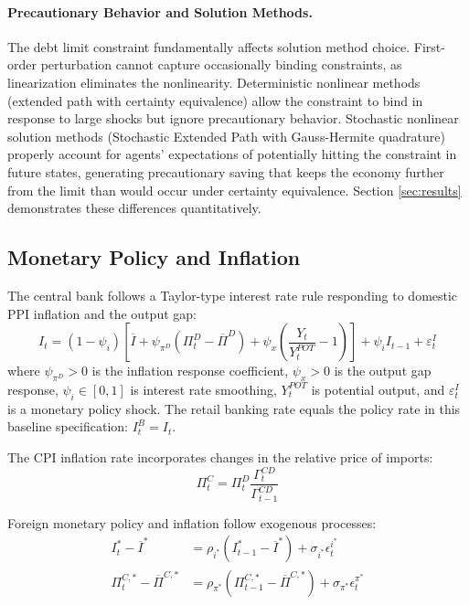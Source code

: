 \documentclass[12pt]{article}
\begin{document}
\paragraph{Precautionary Behavior and Solution Methods.} The debt limit constraint fundamentally affects solution method choice. First-order perturbation cannot capture occasionally binding constraints, as linearization eliminates the nonlinearity. Deterministic nonlinear methods (extended path with certainty equivalence) allow the constraint to bind in response to large shocks but ignore precautionary behavior. Stochastic nonlinear solution methods (Stochastic Extended Path with Gauss-Hermite quadrature) properly account for agents' expectations of potentially hitting the constraint in future states, generating precautionary saving that keeps the economy further from the limit than would occur under certainty equivalence. Section \ref{sec:results} demonstrates these differences quantitatively.

\subsection{Monetary Policy and Inflation}

The central bank follows a Taylor-type interest rate rule responding to domestic PPI inflation and the output gap:
\begin{equation}\label{eq:taylor}
I_t = (1-\psi_i) \left[ \overline{I} + \psi_{\pi^D} (\Pi_t^D - \overline{\Pi}^D) + \psi_x \left( \frac{Y_t}{Y_t^{POT}} - 1 \right) \right] + \psi_i I_{t-1} + \varepsilon_t^I
\end{equation}
where $\psi_{\pi^D} > 0$ is the inflation response coefficient, $\psi_x > 0$ is the output gap response, $\psi_i \in [0,1]$ is interest rate smoothing, $Y_t^{POT}$ is potential output, and $\varepsilon_t^I$ is a monetary policy shock. The retail banking rate equals the policy rate in this baseline specification: $I_t^B = I_t$.

The CPI inflation rate incorporates changes in the relative price of imports:
\begin{equation}
\Pi_t^C = \Pi_t^D \frac{\Gamma_t^{CD}}{\Gamma_{t-1}^{CD}}
\end{equation}

Foreign monetary policy and inflation follow exogenous processes:
\begin{align}
I_t^* - \overline{I}^* &= \rho_{i^*} (I_{t-1}^* - \overline{I}^*) + \sigma_{i^*} \epsilon_t^{i^*} \\
\Pi_t^{C,*} - \overline{\Pi}^{C,*} &= \rho_{\pi^*} (\Pi_{t-1}^{C,*} - \overline{\Pi}^{C,*}) + \sigma_{\pi^*} \epsilon_t^{\pi^*}
\end{align}
\end{document}
